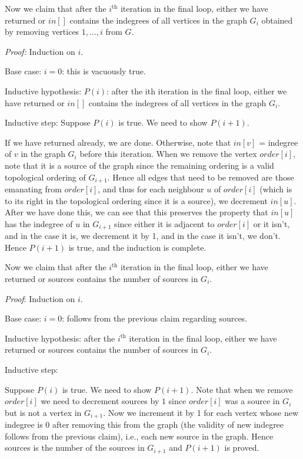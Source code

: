 \documentclass[answers]{exam}
\begin{document}
\begin{questions}
\begin{solution}
Now we claim that after the $i^\mathrm{th}$ iteration in the final loop, either we have returned or $in[]$ contains the indegrees of all vertices in the graph $G_i$ obtained by removing vertices $1,
\dots, i$ from $G$.

\textit{Proof:} Induction on $i$.

Base case: $i = 0$: this is vacuously true.

Inductive hypothesis: 
$P(i)$: after the ith iteration in the final loop, either we have returned or $in[]$ contains the indegrees of all vertices in the graph $G_i$.

Inductive step:
Suppose $P(i)$ is true. We need to show $P(i + 1)$.

If we have returned already, we are done. Otherwise, note that $in[v]$ = indegree of $v$ in the graph $G_i$ before this iteration. When we remove the vertex $order[i]$, note that it is a source of the
graph since the remaining ordering is a valid topological ordering of $G_{i + 1}$. Hence all edges that need to be removed are those emanating from $order[i]$, and thus for each neighbour $u$ of
$order[i]$ (which is to its right in the topological ordering since it is a source), we decrement $in[u]$. After we have done this, we can see that this preserves the property that $in[u]$ has the
indegree of $u$ in $G_{i + 1}$ since either it is adjacent to $order[i]$ or it isn't, and in the case it is, we decrement it by 1, and in the case it isn't, we don't. Hence $P(i + 1)$ is true, and the induction is complete.

Now we claim that after the $i^\mathrm{th}$ iteration in the final loop, either we have returned or sources contains the number of sources in $G_i$.

\textit{Proof}: Induction on $i$.

Base case: $i = 0$: follows from the previous claim regarding sources.

Inductive hypothesis: after the $i^\mathrm{th}$ iteration in the final loop, either we have returned or sources contains the number of sources in $G_i$.

Inductive step:

Suppose $P(i)$ is true. We need to show $P(i + 1)$. 
Note that when we remove $order[i]$ we need to decrement sources by $1$ since $order[i]$ was a source in $G_i$ but is not a vertex in $G_{i + 1}$. Now we increment it by 1 for each vertex whose new
indegree is 0 after removing this from the graph (the validity of new indegree follows from the previous claim), i.e., each new source in the graph. Hence sources is the number of the sources in $G_{i
+ 1}$ and $P(i + 1)$ is proved.


\end{solution}
\end{questions}
\end{document}
